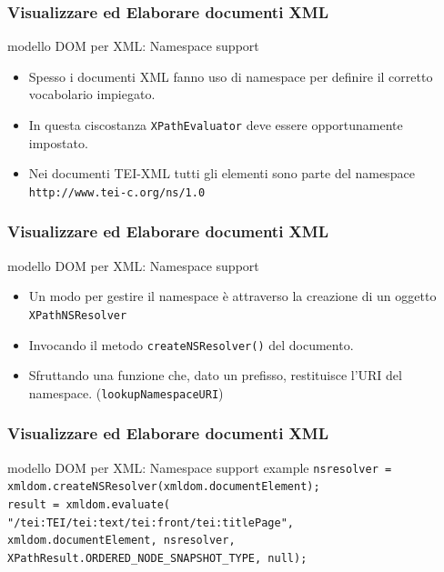 \begin{frame}
    \frametitle{Visualizzare ed Elaborare documenti XML}
    \addtocounter{nframe}{1}
    

    \begin{block}{modello DOM per XML: Namespace support}
        \begin{itemize}
            \item Spesso i documenti XML fanno uso di namespace per definire il corretto vocabolario impiegato.
            \item In questa ciscostanza \texttt{XPathEvaluator} deve essere opportunamente impostato.
            \item Nei documenti TEI-XML tutti gli elementi sono parte del namespace \texttt{http://www.tei-c.org/ns/1.0}
        \end{itemize}
        
    \end{block}
     
\end{frame}


\begin{frame}
    \frametitle{Visualizzare ed Elaborare documenti XML}
    \addtocounter{nframe}{1}
    

    \begin{block}{modello DOM per XML: Namespace support}
        \begin{itemize}
            \item Un modo per gestire il namespace è attraverso la creazione di un oggetto \texttt{XPathNSResolver}
            \item Invocando il metodo \texttt{createNSResolver()} del documento.
            \item Sfruttando una funzione che, dato un prefisso, restituisce l'URI del namespace. (\texttt{lookupNamespaceURI})
        \end{itemize}
    \end{block}

     
\end{frame}

\begin{frame}
    \frametitle{Visualizzare ed Elaborare documenti XML}
    \addtocounter{nframe}{1}
    
    \begin{block}{modello DOM per XML: Namespace support example}
        \texttt{nsresolver = xmldom.createNSResolver(xmldom.documentElement);} 
        \\\texttt{result = xmldom.evaluate(} \\\texttt{"/tei:TEI/tei:text/tei:front/tei:titlePage",} \\\texttt{xmldom.documentElement, nsresolver, XPathResult.ORDERED\_NODE\_SNAPSHOT\_TYPE, null);}
    \end{block}
     
\end{frame}

